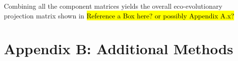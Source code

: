 \documentclass[11pt]{article}
\begin{document}
Combining all the component matrices yields the overall eco-evolutionary projection matrix shown in \hl{Reference a Box here?  or possibly Appendix A.x?}


%
%
%
%
%

\renewcommand{\theequation}{A\arabic{equation}}
\renewcommand{\thetable}{A\arabic{table}}
\setcounter{equation}{0}  %
\setcounter{figure}{0}
\setcounter{table}{0}

\section{Appendix B: Additional Methods}


%
%

\end{document}
